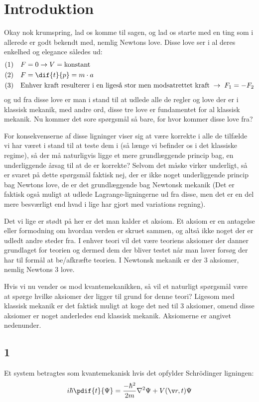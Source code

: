 
\section{Introduktion}
Okay nok krumspring, lad os komme til sagen, og lad os starte med en ting som i allerede er godt bekendt med, nemlig Newtons love. Disse love ser i al deres enkelhed og elegance således ud:
\begin{align*}
    (1)\quad & F=0 \rightarrow V=\text{konstant}\\
    (2)\quad & F=\dif{t}{p}=m\cdot a\\
    (3)\quad & \text{Enhver kraft resulterer i en ligeså stor men modsatrettet kraft}\; \rightarrow \; F_{1}=-F_{2}
\end{align*}
og ud fra disse love er man i stand til at udlede alle de regler og love der er i klassisk mekanik, med andre ord, disse tre love er fundamentet for al klassisk mekanik. Nu kommer det sore spørgsmål så bare, for hvor kommer disse love fra?

For konsekvenserne af disse ligninger viser sig at være korrekte i alle de tilfælde vi har været i stand til at teste dem i (så længe vi befinder os i det klassiske regime), så der må naturligvis ligge et mere grundlæggende princip bag, en underliggende årsag til at de er korrekte? Selvom det måske virker underligt, så er svaret på dette spørgsmål faktisk nej, der er ikke noget underliggende princip bag Newtons love, de er det grundlæggende bag Newtonsk mekanik (Det er faktisk også muligt at udlede Lagrange-ligningerne ud fra disse, men det er en del mere besværligt end hvad i lige har gjort med variations regning).

Det vi lige er stødt på her er det man kalder et aksiom. Et aksiom er en antagelse eller formodning om hvordan verden er skruet sammen, og altså ikke noget der er udledt andre steder fra. I enhver teori vil det være teoriens aksiomer der danner grundlaget for teorien og dermed dem der bliver testet når man laver forsøg der har til formål at be/afkræfte teorien. I Newtonsk mekanik er der 3 aksiomer, nemlig Newtons 3 love.

Hvis vi nu vender os mod kvantemekanikken, så vil et naturligt spørgsmål være at spørge hvilke aksiomer der ligger til grund for denne teori? Ligesom med klassisk mekanik er det faktisk muligt at koge det ned til 3 aksiomer, omend disse aksiomer er noget anderledes end klassisk mekanik. Aksiomerne er angivet nedenunder.

\subsection*{1}
Et system betragtes som kvantemekanisk hvis det opfylder Schrödinger ligningen:
\begin{equation}
    i\hbar\pdif{t}{\Psi}=\frac{-\hbar^{2}}{2m}\nabla^{2}\Psi+V(\v r,t)\Psi
\label{kvant:eq:sch}
\end{equation}
